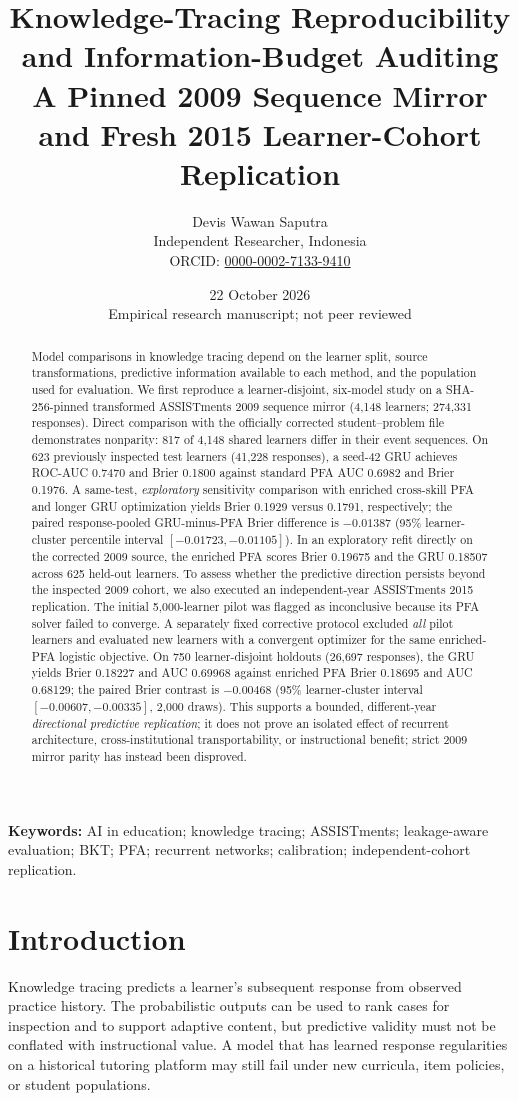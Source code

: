 \documentclass[11pt,a4paper]{article}
\title{Knowledge-Tracing Reproducibility and Information-Budget Auditing\\\large A Pinned 2009 Sequence Mirror and Fresh 2015 Learner-Cohort Replication}
\author{Devis Wawan Saputra\\\small Independent Researcher, Indonesia\\\small ORCID: \href{https://orcid.org/0000-0002-7133-9410}{0000-0002-7133-9410}}
\date{22 October 2026\\\small Empirical research manuscript; not peer reviewed}
\begin{document}
\maketitle
\begin{abstract}
Model comparisons in knowledge tracing depend on the learner split, source transformations, predictive information available to each method, and the population used for evaluation. We first reproduce a learner-disjoint, six-model study on a SHA-256-pinned transformed ASSISTments 2009 sequence mirror (4,148 learners; 274,331 responses). Direct comparison with the officially corrected student--problem file demonstrates nonparity: 817 of 4,148 shared learners differ in their event sequences. On 623 previously inspected test learners (41,228 responses), a seed-42 GRU achieves ROC-AUC 0.7470 and Brier 0.1800 against standard PFA AUC 0.6982 and Brier 0.1976. A same-test, \emph{exploratory} sensitivity comparison with enriched cross-skill PFA and longer GRU optimization yields Brier 0.1929 versus 0.1791, respectively; the paired response-pooled GRU-minus-PFA Brier difference is $-0.01387$ (95\% learner-cluster percentile interval $[-0.01723,-0.01105]$). In an exploratory refit directly on the corrected 2009 source, the enriched PFA scores Brier 0.19675 and the GRU 0.18507 across 625 held-out learners. To assess whether the predictive direction persists beyond the inspected 2009 cohort, we also executed an independent-year ASSISTments 2015 replication. The initial 5,000-learner pilot was flagged as inconclusive because its PFA solver failed to converge. A separately fixed corrective protocol excluded \emph{all} pilot learners and evaluated new learners with a convergent optimizer for the same enriched-PFA logistic objective. On 750 learner-disjoint holdouts (26,697 responses), the GRU yields Brier 0.18227 and AUC 0.69968 against enriched PFA Brier 0.18695 and AUC 0.68129; the paired Brier contrast is $-0.00468$ (95\% learner-cluster interval $[-0.00607,-0.00335]$, 2,000 draws). This supports a bounded, different-year \emph{directional predictive replication}; it does not prove an isolated effect of recurrent architecture, cross-institutional transportability, or instructional benefit; strict 2009 mirror parity has instead been disproved.
\end{abstract}
\textbf{Keywords:} AI in education; knowledge tracing; ASSISTments; leakage-aware evaluation; BKT; PFA; recurrent networks; calibration; independent-cohort replication.

\section{Introduction}
Knowledge tracing predicts a learner's subsequent response from observed practice history. The probabilistic outputs can be used to rank cases for inspection and to support adaptive content, but predictive validity must not be conflated with instructional value. A model that has learned response regularities on a historical tutoring platform may still fail under new curricula, item policies, or student populations.
\end{document}
